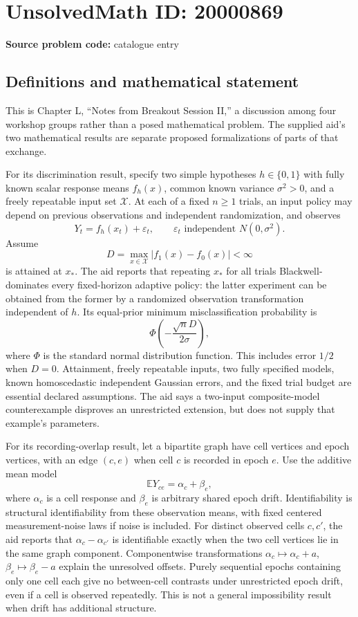 \documentclass[11pt]{article}
\newcommand{\E}{\mathbb{E}}
\begin{document}
\section*{UnsolvedMath ID: 20000869}
\textbf{Source problem code:} catalogue entry
\subsection{Definitions and mathematical statement}
This is Chapter L, ``Notes from Breakout Session II,'' a discussion among four workshop groups rather than a posed mathematical problem. The supplied aid's two mathematical results are separate proposed formalizations of parts of that exchange.

For its discrimination result, specify two simple hypotheses \(h\in\{0,1\}\) with fully known scalar response means \(f_h(x)\), common known variance \(\sigma^2>0\), and a freely repeatable input set \(\mathcal X\). At each of a fixed \(n\ge1\) trials, an input policy may depend on previous observations and independent randomization, and observes
\[
 Y_t=f_h(x_t)+\varepsilon_t,
 \qquad\varepsilon_t\text{ independent }N(0,\sigma^2).
\]
Assume
\[
 D=\max_{x\in\mathcal X}|f_1(x)-f_0(x)|<\infty
\]
is attained at \(x_*\). The aid reports that repeating \(x_*\) for all trials Blackwell-dominates every fixed-horizon adaptive policy: the latter experiment can be obtained from the former by a randomized observation transformation independent of \(h\). Its equal-prior minimum misclassification probability is
\[
 \Phi\left(-\frac{\sqrt nD}{2\sigma}\right),
\]
where \(\Phi\) is the standard normal distribution function. This includes error \(1/2\) when \(D=0\). Attainment, freely repeatable inputs, two fully specified models, known homoscedastic independent Gaussian errors, and the fixed trial budget are essential declared assumptions. The aid says a two-input composite-model counterexample disproves an unrestricted extension, but does not supply that example's parameters.

For its recording-overlap result, let a bipartite graph have cell vertices and epoch vertices, with an edge \((c,e)\) when cell \(c\) is recorded in epoch \(e\). Use the additive mean model
\[
 \E Y_{ce}=\alpha_c+\beta_e,
\]
where \(\alpha_c\) is a cell response and \(\beta_e\) is arbitrary shared epoch drift. Identifiability is structural identifiability from these observation means, with fixed centered measurement-noise laws if noise is included. For distinct observed cells \(c,c'\), the aid reports that \(\alpha_c-\alpha_{c'}\) is identifiable exactly when the two cell vertices lie in the same graph component. Componentwise transformations \(\alpha_c\mapsto\alpha_c+a\), \(\beta_e\mapsto\beta_e-a\) explain the unresolved offsets. Purely sequential epochs containing only one cell each give no between-cell contrasts under unrestricted epoch drift, even if a cell is observed repeatedly. This is not a general impossibility result when drift has additional structure.
\end{document}
